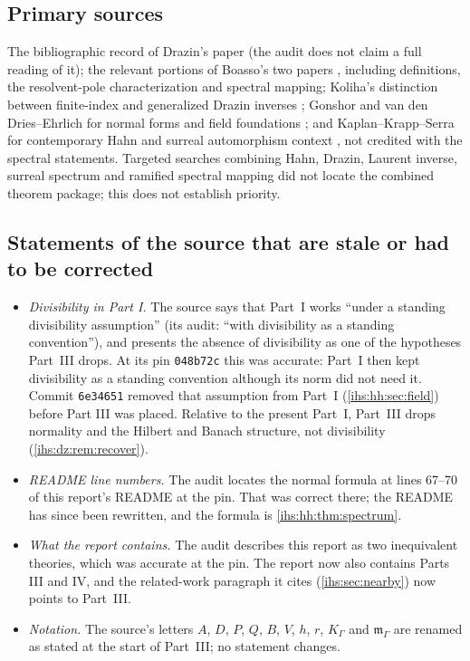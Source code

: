 \documentclass[11pt,a4paper]{article}
\numberwithin{equation}{section}
\theoremstyle{definition}
\theoremstyle{remark}
\begin{document}
\subsection{Primary sources}\label{ihs:app:sourcesC}
The bibliographic record of Drazin's paper \cite{Drazin} (the audit does not
claim a full reading of it); the relevant portions of Boasso's two papers
\cite{BoassoOperators,Boasso}, including definitions, the resolvent-pole
characterization and spectral mapping; Koliha's distinction between
finite-index and generalized Drazin inverses \cite{Koliha}; Gonshor and van
den Dries--Ehrlich for normal forms and field foundations
\cite{Gonshor,DriesEhrlich}; and Kaplan--Krapp--Serra for contemporary Hahn
and surreal automorphism context \cite{KaplanKrappSerra}, not credited with
the spectral statements. Targeted searches combining Hahn, Drazin, Laurent
inverse, surreal spectrum and ramified spectral mapping did not locate the
combined theorem package; this does not establish priority.

\subsection{Statements of the source that are stale or had to be corrected}\label{ihs:app:staleC}
\begin{itemize}
\item \emph{Divisibility in Part I.} The source says that Part~I works
 ``under a standing divisibility assumption'' (its audit: ``with
 divisibility as a standing convention''), and presents the absence of
 divisibility as one of the hypotheses Part~III drops. At its pin
 \texttt{048b72c} this was accurate: Part~I then kept divisibility as a
 standing convention although its norm did not need it. Commit
 \texttt{6e34651} removed that assumption from Part~I
 (\cref{ihs:hh:sec:field}) before Part III was placed. Relative to the
 present Part~I, Part~III drops normality and the Hilbert and Banach
 structure, not divisibility (\cref{ihs:dz:rem:recover}).
\item \emph{README line numbers.} The audit locates the normal formula at
 lines 67--70 of this report's README at the pin. That was correct there;
 the README has since been rewritten, and the formula is
 \cref{ihs:hh:thm:spectrum}.
\item \emph{What the report contains.} The audit describes this report as two
 inequivalent theories, which was accurate at the pin. The report now also
 contains Parts III and IV, and the related-work paragraph it cites
 (\cref{ihs:sec:nearby}) now points to Part~III.
\item \emph{Notation.} The source's letters $A$, $D$, $P$, $Q$, $B$, $V$,
 $h$, $r$, $K_\Gamma$ and $\mathfrak m_\Gamma$ are renamed as stated at the
 start of Part~III; no statement changes.
\end{itemize}
\end{document}
